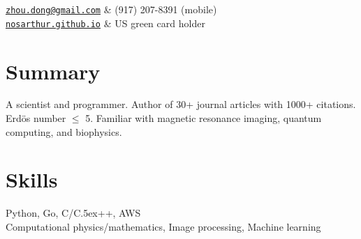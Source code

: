 \documentclass[centered,11pt,overlapped]{res}
\def\Cplusplus{{\rm C\raise.5ex\hbox{\small ++}}}
\begin{document}


\begin{resume}

\begin{ncolumn}{2}
   {\tt \href{mailto:zhou.dong@gmail.com}{zhou.dong@gmail.com}} &  (917) 207-8391 (mobile) \\
   {\tt \href{https://nosarthur.github.io}{nosarthur.github.io}} &  US green card holder
\end{ncolumn}


\section{\sc Summary}
A scientist and programmer.
Author of 30+ journal articles with 1000+ citations.
Erd\"{o}s number $\le$ 5.
Familiar with magnetic resonance imaging, quantum computing, and biophysics.


\section{\sc Skills}
Python, Go, C/\Cplusplus, AWS\\
Computational physics/mathematics, Image processing, Machine learning



\end{resume}
\end{document}
